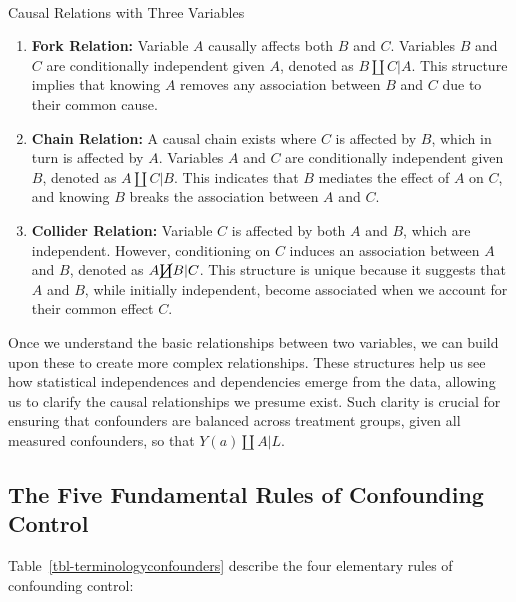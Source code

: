 \documentclass[
  single column]{article}
\makeatletter
\let\oldparagraph\paragraph
\renewcommand{\paragraph}{
    \@ifstar
      \xxxParagraphStar
      \xxxParagraphNoStar
  }
\newcommand{\xxxParagraphStar}[1]{\oldparagraph*{#1}\mbox{}}
\newcommand{\xxxParagraphNoStar}[1]{\oldparagraph{#1}\mbox{}}
\providecommand{\tightlist}{%
  \setlength{\itemsep}{0pt}\setlength{\parskip}{0pt}}\usepackage{longtable,booktabs,array}
\makeatother
\begin{document}
\paragraph{Causal Relations with Three
Variables}\label{causal-relations-with-three-variables}

\begin{enumerate}
\def\labelenumi{\arabic{enumi}.}
\setcounter{enumi}{2}
\tightlist
\item
  \textbf{Fork Relation:} Variable \(A\) causally affects both \(B\) and
  \(C\). Variables \(B\) and \(C\) are conditionally independent given
  \(A\), denoted as \(B \coprod C | A\). This structure implies that
  knowing \(A\) removes any association between \(B\) and \(C\) due to
  their common cause.
\item
  \textbf{Chain Relation:} A causal chain exists where \(C\) is affected
  by \(B\), which in turn is affected by \(A\). Variables \(A\) and
  \(C\) are conditionally independent given \(B\), denoted as
  \(A \coprod C | B\). This indicates that \(B\) mediates the effect of
  \(A\) on \(C\), and knowing \(B\) breaks the association between \(A\)
  and \(C\).
\item
  \textbf{Collider Relation:} Variable \(C\) is affected by both \(A\)
  and \(B\), which are independent. However, conditioning on \(C\)
  induces an association between \(A\) and \(B\), denoted as
  \(A \cancel\coprod B | C\). This structure is unique because it
  suggests that \(A\) and \(B\), while initially independent, become
  associated when we account for their common effect \(C\).
\end{enumerate}

Once we understand the basic relationships between two variables, we can
build upon these to create more complex relationships. These structures
help us see how statistical independences and dependencies emerge from
the data, allowing us to clarify the causal relationships we presume
exist. Such clarity is crucial for ensuring that confounders are
balanced across treatment groups, given all measured confounders, so
that \(Y(a) \coprod A | L\).

\newpage{}

\subsection{The Five Fundamental Rules of Confounding
Control}\label{the-five-fundamental-rules-of-confounding-control}

Table~\ref{tbl-terminologyconfounders} describe the four elementary
rules of confounding control:
\end{document}
